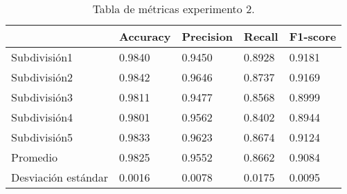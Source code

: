 \begin{table}[H]
\centering
\begin{tabular}{|l|llll|}
\hline
              & Accuracy &     Precision &     Recall  &   F1-score \\ \hline
              
Subdivisión1            &       0.9840  &       0.9450  &       0.8928  &       0.9181  \\ 
Subdivisión2            &       0.9842  &       0.9646  &       0.8737  &       0.9169  \\ 
Subdivisión3            &       0.9811  &       0.9477  &       0.8568  &       0.8999  \\ 
Subdivisión4            &       0.9801  &       0.9562  &       0.8402  &       0.8944  \\ 
Subdivisión5            &       0.9833  &       0.9623  &       0.8674  &       0.9124  \\ \hline
Promedio                &       0.9825  &       0.9552  &       0.8662  &       0.9084  \\ \hline
Desviación estándar     &       0.0016  &       0.0078  &       0.0175  &       0.0095  \\ \hline
              
\end{tabular}
\caption{Tabla de métricas experimento 2.}
		     \label{tab:exp2}
\end{table}